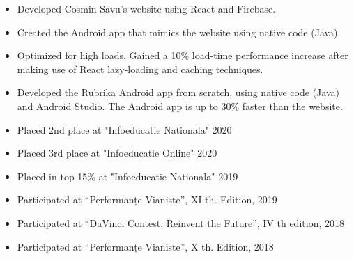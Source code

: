\documentclass[10pt,a4paper,ragged2e]{resume}
\begin{document}

    \begin{fullwidth}
        \makecvheader
    \end{fullwidth}



    \begin{itemize}
        \item Developed Cosmin Savu's website using React and Firebase.
        \smallskip
        \item Created the Android app that mimics the website using native code (Java).
        \item Optimized for high loads. Gained a 10\% load-time performance increase after making use of React lazy-loading and caching techniques.
        \smallskip
    \end{itemize}

    \divider

    \begin{itemize}
        \item Developed the Rubrika Android app from scratch, using native code (Java) and Android Studio. The Android app is up to 30\% faster than the website.
        \smallskip
    \end{itemize}


    \smallskip
    \begin{itemize}
        \item Placed 2nd place at "Infoeducatie Nationala" 2020
        \item Placed 3rd place at "Infoeducatie Online" 2020
        \item Placed in top 15\% at "Infoeducatie Nationala" 2019
        \item Participated at \textquotedblleft Performanțe Vianiste\textquotedblright, XI th. Edition, 2019
        \item Participated at \textquotedblleft DaVinci Contest, Reinvent the Future\textquotedblright, IV th edition, 2018
        \item Participated at \textquotedblleft Performanțe Vianiste\textquotedblright, X th. Edition, 2018
    \end{itemize}
\end{document}
